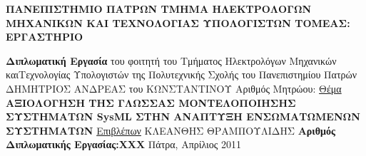 \documentclass[a4paper,12pt,twoside]{report}
\newcommand{ \FirstName}{ΔΗΜΗΤΡΙΟΣ ΑΝΔΡΕΑΣ }
\newcommand{ \FathersName}{ΚΩΝΣΤΑΝΤΙΝΟΥ}
\newcommand{ \AM}{5657}
\newcommand{ \ThesisTitle}{ΑΞΙΟΛΟΓΗΣΗ ΤΗΣ ΓΛΩΣΣΑΣ ΜΟΝΤΕΛΟΠΟΙΗΣΗΣ ΣΥΣΤΗΜΑΤΩΝ SysML ΣΤΗΝ ΑΝΑΠΤΥΞΗ ΕΝΣΩΜΑΤΩΜΕΝΩΝ ΣΥΣΤΗΜΑΤΩΝ}
\newcommand{ \FirstProfessor}{ΚΛΕΑΝΘΗΣ ΘΡΑΜΠΟΥΛΙΔΗΣ}
\newcommand{ \ThesisNumber}{ΧΧΧ}
\newcommand{ \Month}{Απρίλιος}
\newcommand{ \Year}{2011}
\begin{document}
	{\label{Πρώτη σελίδα} 
		\newpage
		\begin{flushleft}
			\textbf{
				{\large ΠΑΝΕΠΙΣΤΗΜΙΟ ΠΑΤΡΩΝ} \linebreak
				{\normalsize ΤΜΗΜΑ ΗΛΕΚΤΡΟΛΟΓΩΝ ΜΗΧΑΝΙΚΩΝ \linebreak ΚΑΙ ΤΕΧΝΟΛΟΓΙΑΣ ΥΠΟΛΟΓΙΣΤΩΝ}\linebreak
				{\small ΤΟΜΕΑΣ:}\linebreak
				{\footnotesize ΕΡΓΑΣΤΗΡΙΟ }
			}
		\end{flushleft}
		\hrulefill
	
		\begin{center}
			\textbf{{\LARGE Διπλωματική Εργασία}}\linebreak
			{\large του φοιτητή του Τμήματος Ηλεκτρολόγων Μηχανικών και\linebreak 	Τεχνολογίας Υπολογιστών της Πολυτεχνικής Σχολής του \linebreak Πανεπιστημίου Πατρών}
			\linebreak \linebreak \linebreak
			{\large  \FirstName του \FathersName}
			\linebreak \linebreak
			{\large Αριθμός Μητρώου:\linebreak \AM}
			\linebreak \linebreak  \linebreak
			{\large \underline{Θέμα}}
			\linebreak  \linebreak
			{\Large \textbf{ \ThesisTitle}}
			\linebreak \linebreak \linebreak
			{\large \underline{Επιβλέπων}}
			\linebreak  \linebreak
			{\large \FirstProfessor}
			\linebreak \linebreak \linebreak \linebreak
			{\large \textbf{Αριθμός Διπλωματικής Εργασίας:\linebreak \ThesisNumber}}
			\linebreak \linebreak
			{\large Πάτρα, \Month \hspace{1pt} \Year}
		\end{center}
	}
 
\end{document}
